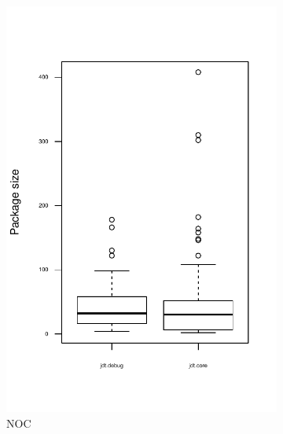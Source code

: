 \begin{figure}
        \begin{subfigure}[b]{0.48\textwidth}
                \centering
                \includegraphics[width=\textwidth]{img/package-size-noc.pdf}
                \caption{NOC}
        \end{subfigure}%
        ~ %
        \begin{subfigure}[b]{0.48\textwidth}
                \centering

\end{subfigure}
\end{figure}
